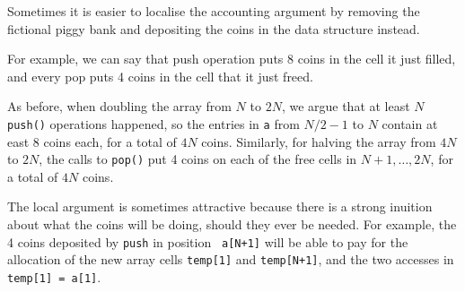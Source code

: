 \documentclass{tufte-handout}
\begin{document}
Sometimes it is easier to localise the accounting argument by removing
the fictional piggy bank and depositing the coins in the data
structure instead.

For example, we can say that push operation puts 8 coins in the cell
it just filled, and every pop puts 4 coins in the cell that it just
freed. 

As before, when doubling the array from $N$ to $2N$, we argue that at
least $N$ {\tt push()} operations happened, so the entries in {\tt a}
from $N/2-1$ to $N$ contain at east 8 coins each, for a total of $4N$
coins. Similarly, for halving the array from $4N$ to $2N$, the calls
to {\tt pop()} put 4 coins on each of the free cells in $N+1,\ldots,
2N$, for a total of $4N$ coins. 

The local argument is sometimes attractive because there is a strong
inuition about what the coins will be doing, should they ever be
needed.  
For example, the 4 coins deposited by {\tt push} in position {\tt
  a[N+1]} will be able to pay for the allocation of the new array
cells {\tt temp[1]} and {\tt temp[N+1]}, and the two accesses in {\tt
  temp[1] = a[1]}.
\end{document}
